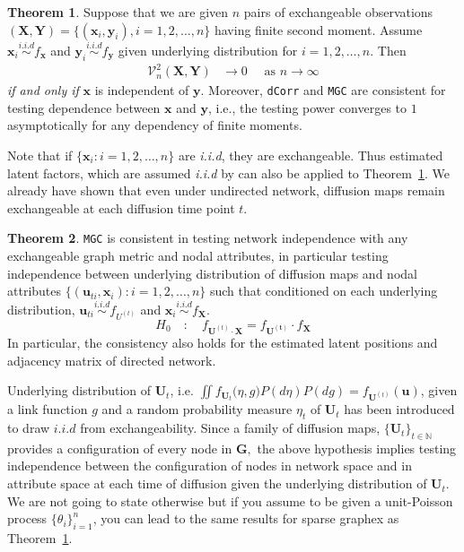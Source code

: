 \documentclass[12pt]{article}
\theoremstyle{definition}
\newtheorem{theorem}{Theorem}[section]
\begin{document}
\begin{theorem}
	Suppose that we are given $n$ pairs of exchangeable observations $(\mathbf{X}, \mathbf{Y}) = \{  (\mathbf{x}_{i}, \mathbf{y}_{i} ), i = 1,2, \ldots, n \}$ having finite second moment. Assume $\mathbf{x}_{i} \overset{i.i.d}{\sim} f_{\mathbf{x}}$ and $\mathbf{y}_{i} \overset{i.i.d}{\sim} f_{\mathbf{y}}$ given underlying distribution for $i = 1,2, \ldots, n$. Then
	\begin{eqnarray}
		\mathcal{V}_{n}^{2}(\mathbf{X},\mathbf{Y}) &\longrightarrow 0 \quad \mbox{ as } n \rightarrow \infty
	\end{eqnarray}	
	\textit{if and only if} $\mathbf{x}$ is independent of $\mathbf{y}$. Moreover, \texttt{dCorr} and \texttt{MGC} are consistent for testing dependence between $\mathbf{x}$ and $\mathbf{y}$, i.e., the testing power converges to $1$ asymptotically for any dependency of finite moments.
	\label{theoremMain}
\end{theorem}

Note that if $\{ \mathbf{x}_{i} : i = 1,2,\ldots, n \}$ are \textit{i.i.d}, they are exchangeable. Thus estimated latent factors, which are assumed \textit{i.i.d} by \cite{fosdick2015testing} can also be applied to Theorem~\ref{theoremMain}. We already have shown that even under undirected network, diffusion maps remain exchangeable at each diffusion time point $t$. 

\begin{theorem}
	\label{theorem2}
	\texttt{MGC} is consistent in testing network independence with any exchangeable graph metric and nodal attributes, in particular testing independence between underlying distribution of diffusion maps and nodal attributes $\{ ( \mathbf{u}_{ti},  \mathbf{x}_{i}  ) : i =1,2, \ldots , n \}$ such that conditioned on each underlying distribution, $\mathbf{u}_{ti} \overset{i.i.d}{\sim} f_{U^(t)}$ and $\mathbf{x}_{i} \overset{i.i.d}{\sim} f_{\mathbf{X}}$.
	\begin{equation}
	H_{0}  \quad : \quad f_{\mathbf{U}^{(t)} \cdot \mathbf{X}  }  = f_{\mathbf{U^{(t)}}} \cdot f_{\mathbf{X}}
	\label{eq:hypothesis}
	\end{equation}
	 In particular, the consistency also holds for the estimated latent positions and adjacency matrix of directed network.
\end{theorem}
		
 Underlying distribution of $\mathbf{U}_{t}$, i.e. $\iint  f_{\mathbf{U}_t} \big( \eta, g \big) P(d \eta) P(dg) = f_{\mathbf{U}^{(t)} } (\mathbf{u})$, given a link function $g$ and a random probability measure $\eta_{t}$ of $\mathbf{U}_t$ has been introduced to draw $\textit{i.i.d}$ from exchangeability. Since a family of diffusion maps, $\{ \mathbf{U}_{t} \}_{t \in \mathbb{N}}$ provides a configuration of every node in $\mathbf{G},$ the above hypothesis implies testing independence between the configuration of nodes in network space and in attribute space at each time of diffusion given the underlying distribution of $\mathbf{U}_{t}$.	
We are not going to state otherwise but if you assume to be given a unit-Poisson process $\{ \theta_{i} \}_{i=1}^{n}$, you can lead to the same results for sparse graphex as Theorem~\ref{theoremMain}. 
\end{document}

